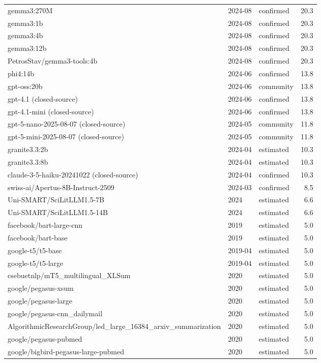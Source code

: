 \documentclass[12pt,letterpaper]{article}
\renewenvironment{table*}{\begin{table}}{\end{table}}
\begin{document}
\begin{table}[!htbp]
\begin{tabularx}{\linewidth}{X l l r}
gemma3:270M & 2024-08 & confirmed & 20.3 \\
gemma3:1b & 2024-08 & confirmed & 20.3 \\
gemma3:4b & 2024-08 & confirmed & 20.3 \\
gemma3:12b & 2024-08 & confirmed & 20.3 \\
PetrosStav/gemma3-tools:4b & 2024-08 & confirmed & 20.3 \\
phi4:14b & 2024-06 & confirmed & 13.8 \\
gpt-oss:20b & 2024-06 & community & 13.8 \\
gpt-4.1 (closed-source) & 2024-06 & confirmed & 13.8 \\
gpt-4.1-mini (closed-source) & 2024-06 & confirmed & 13.8 \\
gpt-5-nano-2025-08-07 (closed-source) & 2024-05 & community & 11.8 \\
gpt-5-mini-2025-08-07 (closed-source) & 2024-05 & community & 11.8 \\
granite3.3:2b & 2024-04 & estimated & 10.3 \\
granite3.3:8b & 2024-04 & estimated & 10.3 \\
claude-3-5-haiku-20241022 (closed-source) & 2024-04 & confirmed & 10.3 \\
swiss-ai/Apertus-8B-Instruct-2509 & 2024-03 & confirmed & 8.5 \\
Uni-SMART/SciLitLLM1.5-7B & 2024 & estimated & 6.6 \\
Uni-SMART/SciLitLLM1.5-14B & 2024 & estimated & 6.6 \\
facebook/bart-large-cnn & 2019 & estimated & 5.0 \\
facebook/bart-base & 2019 & estimated & 5.0 \\
google-t5/t5-base & 2019-04 & estimated & 5.0 \\
google-t5/t5-large & 2019-04 & estimated & 5.0 \\
csebuetnlp/mT5\_multilingual\_XLSum & 2020 & estimated & 5.0 \\
google/pegasus-xsum & 2020 & estimated & 5.0 \\
google/pegasus-large & 2020 & estimated & 5.0 \\
google/pegasus-cnn\_dailymail & 2020 & estimated & 5.0 \\
AlgorithmicResearchGroup/led\_large\_16384\_arxiv\_summarization & 2020 & estimated & 5.0 \\
google/pegasus-pubmed & 2020 & estimated & 5.0 \\
google/bigbird-pegasus-large-pubmed & 2020 & estimated & 5.0 \\

\end{tabularx}
\end{table}
\end{document}
